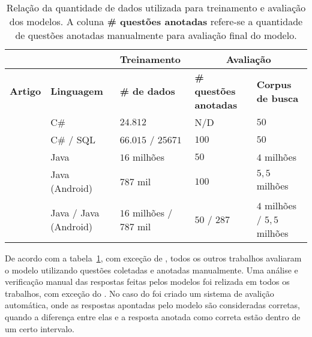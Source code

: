 \begin{table}[h]
\centering
\begin{tabular}{ p{8em} p{6em} p{6em} p{8em} p{6em} }
\hline
 &  & \textbf{Treinamento} & \multicolumn{2}{c}{\textbf{Avaliação}} \\
\hline
\textbf{Artigo} & \textbf{Linguagem} & \textbf{\# de dados} & \textbf{\# questões anotadas} & \textbf{Corpus de busca}  \\
\hline

\cite{Allamanis-bimodal-source-code-natural-language:2015} & C\# & $24.812$ & N/D & $50$ \\

\cite{Chen-bi-variational-autoencoder:2018} & \multirow{2}{6em}{\centering C\# / SQL} &
\multirow{2}{6em}{\centering $66.015$ / $25671$} & \multirow{2}{8em}{\centering $100$} & \multirow{2}{8em}{\centering $50$} \\

\cite{iyer-etal-2016-summarizing} &  &  &  &  \\

\cite{Gu-deep-code-search:2018} & Java & $16$ milhões & $50$ & $4$ milhões \\

\cite{Sachdev-neural-code-search:2018} & Java (Android) & $787$ mil & $100$ & $5,5$ milhões \\

\cite{cambronero-deep-learning-code-search:2019} & Java / Java (Android) & $16$ milhões / $787$ mil & $50$ / $287$ & $4$ milhões / $5,5$ milhões \\

 \hline
 
\end{tabular}
\caption{Relação da quantidade de dados utilizada para treinamento e avaliação dos modelos. A coluna \textbf{\# questões anotadas} refere-se a quantidade de questões anotadas manualmente para avaliação final do modelo.}
\label{table:summary-training-data}
\end{table}

De acordo com a tabela~\ref{table:summary-training-data}, com exceção de \cite{Allamanis-bimodal-source-code-natural-language:2015}, todos os outros trabalhos avaliaram o modelo utilizando questões coletadas e anotadas manualmente. Uma análise e verificação manual das respostas feitas pelos modelos foi relizada em todos os trabalhos, com exceção do \cite{Allamanis-bimodal-source-code-natural-language:2015, cambronero-deep-learning-code-search:2019}. No caso do \cite{cambronero-deep-learning-code-search:2019} foi criado um sistema de avalição automática, onde as respostas apontadas pelo modelo são consideradas corretas, quando a diferença entre elas e a resposta anotada como correta estão dentro de um certo intervalo.

